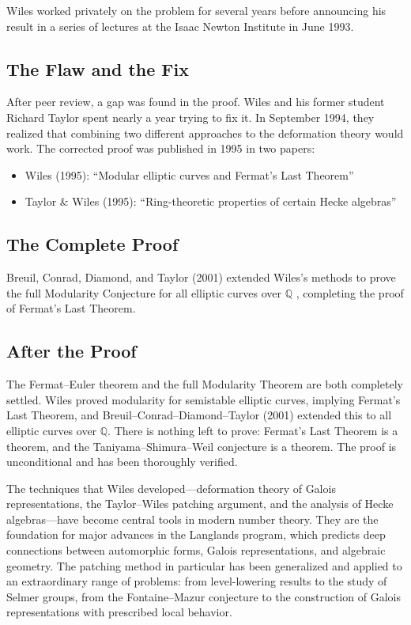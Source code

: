 \begin{highlightbox}
Wiles worked privately on the problem for several years before announcing his result in a series of lectures at the Isaac Newton Institute in June 1993.
\end{highlightbox}

\subsection{The Flaw and the Fix}

After peer review, a gap was found in the proof. Wiles and his former student Richard Taylor spent nearly a year trying to fix it. In September 1994, they realized that combining two different approaches to the deformation theory would work. The corrected proof was published in 1995 in two papers:

\begin{itemize}
\item Wiles (1995): ``Modular elliptic curves and Fermat's Last Theorem'' \cite{wiles1995}
\item Taylor \& Wiles (1995): ``Ring-theoretic properties of certain Hecke algebras'' \cite{taylorwiles1995}
\end{itemize}

\subsection{The Complete Proof}

Breuil, Conrad, Diamond, and Taylor (2001) extended Wiles's methods to prove the full Modularity Conjecture for all elliptic curves over $\mathbb{Q}$ \cite{bcdt2001}, completing the proof of Fermat's Last Theorem.

\subsection{After the Proof}

The Fermat--Euler theorem and the full Modularity Theorem are both completely settled. Wiles proved modularity for semistable elliptic curves, implying Fermat's Last Theorem, and Breuil--Conrad--Diamond--Taylor (2001) extended this to all elliptic curves over $\mathbb{Q}$. There is nothing left to prove: Fermat's Last Theorem is a theorem, and the Taniyama--Shimura--Weil conjecture is a theorem. The proof is unconditional and has been thoroughly verified.

The techniques that Wiles developed---deformation theory of Galois representations, the Taylor--Wiles patching argument, and the analysis of Hecke algebras---have become central tools in modern number theory. They are the foundation for major advances in the Langlands program, which predicts deep connections between automorphic forms, Galois representations, and algebraic geometry. The patching method in particular has been generalized and applied to an extraordinary range of problems: from level-lowering results to the study of Selmer groups, from the Fontaine--Mazur conjecture to the construction of Galois representations with prescribed local behavior.

